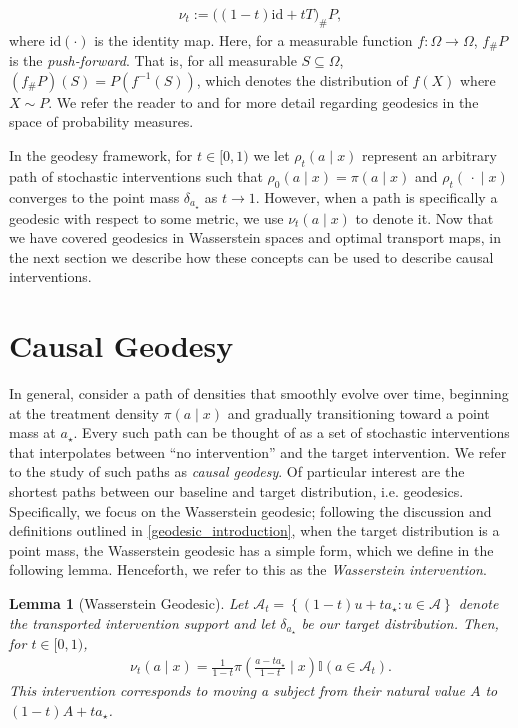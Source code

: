 \documentclass[11pt,twoside]{article}
\newtheorem{lemma}{Lemma}
\theoremstyle{definition}
\theoremstyle{remark}
\begin{document}
\begin{align} \label{wasserstein_geodesic_definition}
\nu_t := \big((1 - t) \text{id} + t T \big)_{\#} P,
\end{align}
where $\text{id}(\cdot)$ is the identity map. Here, for a measurable function $f : \Omega \to \Omega$,  $f_{\#} P$ is the \textit{push-forward}. That is, for all measurable $S \subseteq \Omega$,  $(f_{\#}P)(S) = P(f^{-1}(S))$, which denotes the distribution of $f(X)$ where $X\sim P$. We refer the reader to \cite{ambrosio2008gradient} and \cite{chewi2024statistical} for more detail regarding geodesics in the space of probability measures.

In the geodesy framework, for $t \in [0, 1)$ we let $\rho_t(a \! \mid \! x)$ represent an arbitrary path of stochastic interventions such that $\rho_0(a \! \mid \! x) = \pi(a \! \mid \! x)$ and $\rho_t(\, \cdot  \! \mid \! x)$ converges to the point mass $\delta_{a_{\star}}$ as $t \to 1$. However, when a path is specifically a geodesic with respect to some metric, we use $\nu_t(a \! \mid \! x)$ to denote it. Now that we have covered geodesics in Wasserstein spaces and optimal transport maps, in the next section we describe how these concepts can be used to describe causal interventions.



\section{Causal Geodesy} \label{causal_geodesy_section}

In general, consider a path of densities that smoothly evolve over time, beginning at the treatment density $\pi(a \! \mid \! x)$ and gradually transitioning toward a point mass at $a_{\star}$. Every such path can be thought of as a set of stochastic interventions that interpolates between ``no intervention'' and the target intervention. We refer to the study of such paths as {\em causal geodesy}. Of particular interest are the shortest paths between our baseline and target distribution, i.e. geodesics. Specifically, we focus on the Wasserstein geodesic; following the discussion and definitions outlined in \cref{geodesic_introduction}, when the target distribution is a point mass, the Wasserstein geodesic has a simple form, which we define in the following lemma. Henceforth, we refer to this as the \textit{Wasserstein intervention}.

\begin{lemma}[Wasserstein Geodesic] \label{wasserstein_geodesic_density_point_mass}
Let $\mathcal{A}_t = \left\{(1-t)u+ta_\star:u\in\mathcal{A} \right\}$ denote the transported intervention support and let $\delta_{a_{\star}}$ be our target distribution. Then, for $t \in [0, 1)$, 
\begin{align*}
    \nu_t(a \! \mid \! x) = \frac{1}{1 - t} \pi \! \left( \frac{a - t a_{\star}}{1 - t} \mid x\right) \mathbb{I}(a\in\mathcal{A}_{t}).
\end{align*}
This intervention
corresponds to moving a subject
from their natural value $A$
to $(1-t) A + t a_{\star}$.
\end{lemma}
\end{document}
